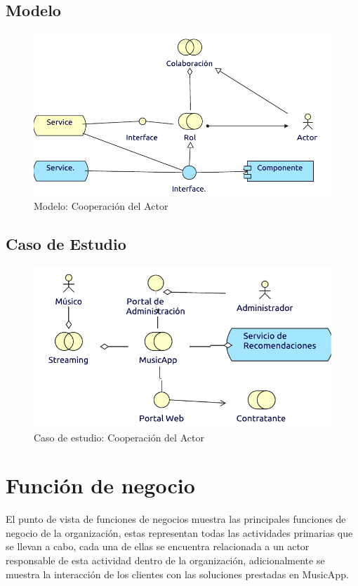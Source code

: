 \subsection{Modelo}
\begin{figure}[h!]
	\centering
	\includegraphics[width=\linewidth]{Arquitectura/Negocio/imgs/cooperacionActorMetaModelo.pdf}
	\caption{Modelo: Cooperación del Actor}
\end{figure}
\newpage
\subsection{Caso de Estudio}

\begin{figure}[h!]
	\centering
	\includegraphics[width=\linewidth]{Arquitectura/Negocio/imgs/cooperacionActor.pdf}
	\caption{Caso de estudio:  Cooperación del Actor}
\end{figure}
\newpage


\section{Función de negocio}
El punto de vista de funciones de negocios muestra las principales funciones de negocio de la organización, estas representan todas las actividades primarias que se llevan a cabo, cada una de ellas se encuentra relacionada a un actor responsable de esta actividad dentro de la organización, adicionalmente se muestra la interacción de los clientes con las soluciones prestadas en MusicApp.\\

